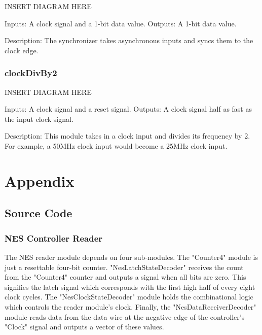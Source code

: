 \documentclass[a4paper]{article}
\begin{document}
INSERT DIAGRAM HERE

Inputs: A clock signal and a 1-bit data value.
Outputs: A 1-bit data value.

Description: The synchronizer takes asynchronous inputs and syncs them to the clock edge.

\subsubsection{clockDivBy2}

INSERT DIAGRAM HERE

Inputs: A clock signal and a reset signal.
Outputs: A clock signal half as fast as the input clock signal.

Description: This module takes in a clock input and divides its frequency by 2. For example, a 50MHz clock input would become a 25MHz clock input.

\section{Appendix}

\subsection{Source Code}%

\subsubsection{NES Controller Reader}
The NES reader module depends on four sub-modules. 
The "Counter4" module is just a resettable four-bit counter.
"NesLatchStateDecoder" receives the count from the "Counter4" counter and outputs a signal when all bits are zero. This signifies the latch signal which corresponds with the first high half of every eight clock cycles.
The "NesClockStateDecoder" module holds the combinational logic which controls the reader module's clock. 
Finally, the "NesDataReceiverDecoder" module reads data from the data wire at the negative edge of the controller's "Clock" signal and outputs a vector of these values. 
\end{document}
